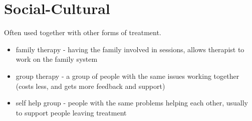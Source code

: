 \documentclass[12pt]{article}
\begin{document}
\section*{Social-Cultural}
Often used together with other forms of treatment. 
\begin{itemize}
\item family therapy - having the family involved in sessions, allows therapist to work on the family system
\item group therapy - a group of people with the same issues working together (costs less, and gets more feedback and support)
\item self help group - people with the same problems helping each other, usually to support people leaving treatment
\end{itemize}
\end{document}
